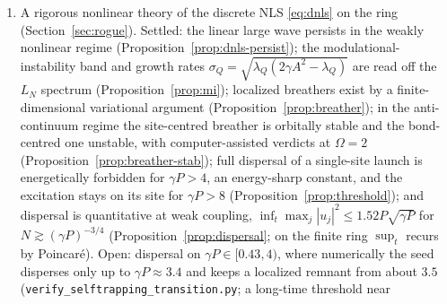 \documentclass[11pt,reqno]{amsart}
\theoremstyle{plain}
\theoremstyle{definition}
\newcommand{\LN}{L_N}
\begin{document}
\begin{enumerate}
constant of Conjecture~\ref{conj:bn-window}: convergence uniform in $s$ (on $t\le N/2$ as on
$t>N/2$), and the Gaussian-excess inequality
$\mathbb E|Z|-\mathbb E|G|\le K_\star\,\Sigma_2^{-3/2}\sum_\ell a_\ell^4$, $K_\star=(h(1)-\sqrt\pi/2)/2$, for
the \emph{balanced} Debye configurations of the profile (the live set is an interval of consecutive integers,
so $|\#\,\mathrm{even}-\#\,\mathrm{odd}|\le1$; sharp at the two-copy pair, while imbalanced configurations
violate the unrestricted bound), whose integrated majorant clears $\beta_{\mathrm{odd}}$ on $[1.005,\infty)$
(the variance floor covers $(1,1.005]$). That inequality is now proved, by rigorous Arb certificates, for every
balanced configuration with at most three copies: the singleton-channel band (\texttt{dagger\_rigorous.py},
\texttt{verify\_dagger\_rigorous.py}) and the near-pair basin (\texttt{dagger\_nearpair.py},
\texttt{verify\_dagger\_nearpair.py}). On configurations with more than three copies it is only validated, and
proving it there needs a bound on the Bessel-ring tail of the Kluyver excess uniform over the balanced
configurations (the discussion after Lemma~\ref{lem:varfloor};
\texttt{verify\_bn\_profile\_gaussian.py}, \texttt{verify\_bandedge\_transfer.py}).
\item A rigorous nonlinear theory of the discrete NLS \eqref{eq:dnls} on the ring
(Section~\ref{sec:rogue}). Settled: the linear large wave persists in the weakly
nonlinear regime (Proposition~\ref{prop:dnls-persist}); the modulational-instability band and growth
rates $\sigma_Q=\sqrt{\lambda_Q(2\gamma A^2-\lambda_Q)}$ are read off the $\LN$ spectrum
(Proposition~\ref{prop:mi}); localized breathers exist by a finite-dimensional variational argument
(Proposition~\ref{prop:breather}); in the anti-continuum regime the site-centred breather is orbitally stable
and the bond-centred one unstable, with computer-assisted verdicts at $\Omega=2$
(Proposition~\ref{prop:breather-stab}); full dispersal of a single-site launch is energetically forbidden for
$\gamma P>4$, an energy-sharp constant, and the excitation stays on its site for $\gamma P>8$
(Proposition~\ref{prop:threshold}); and dispersal is quantitative at weak coupling,
$\inf_t\max_j|u_j|^2\le1.52P\sqrt{\gamma P}$ for $N\gtrsim(\gamma P)^{-3/4}$
(Proposition~\ref{prop:dispersal}; on the finite ring $\sup_t$ recurs by Poincar\'e). Open: dispersal on
$\gamma P\in[0.43,4)$, where numerically the seed disperses only up to $\gamma P\approx3.4$ and keeps a
localized remnant from about $3.5$ (\texttt{verify\_selftrapping\_transition.py}; a long-time threshold near

\end{enumerate}
\end{document}
